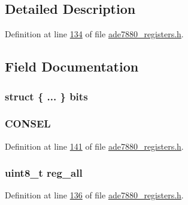 \subsection{Detailed Description}


Definition at line \hyperlink{a00036_source_l00134}{134} of file \hyperlink{a00036_source}{ade7880\-\_\-registers.\-h}.



\subsection{Field Documentation}
\hypertarget{a00010_ac009f1731d8589cf40ae685a468204a7}{
\subsubsection[{bits}]{\setlength{\rightskip}{0pt plus 5cm}struct \{ ... \}  bits}}\label{d7/dec/a00010_ac009f1731d8589cf40ae685a468204a7}
\hypertarget{a00010_a12715df22b18d10a091a29d2dc9a9fd2}{
\subsubsection[{C\-O\-N\-S\-E\-L}]{ C\-O\-N\-S\-E\-L}}\label{d7/dec/a00010_a12715df22b18d10a091a29d2dc9a9fd2}


Definition at line \hyperlink{a00036_source_l00141}{141} of file \hyperlink{a00036_source}{ade7880\-\_\-registers.\-h}.

\hypertarget{a00010_ab2957613fa7f241407cc98e80676dccf}{
\subsubsection[{reg\-\_\-all}]{\setlength{\rightskip}{0pt plus 5cm}uint8\-\_\-t reg\-\_\-all}}\label{d7/dec/a00010_ab2957613fa7f241407cc98e80676dccf}


Definition at line \hyperlink{a00036_source_l00136}{136} of file \hyperlink{a00036_source}{ade7880\-\_\-registers.\-h}.

